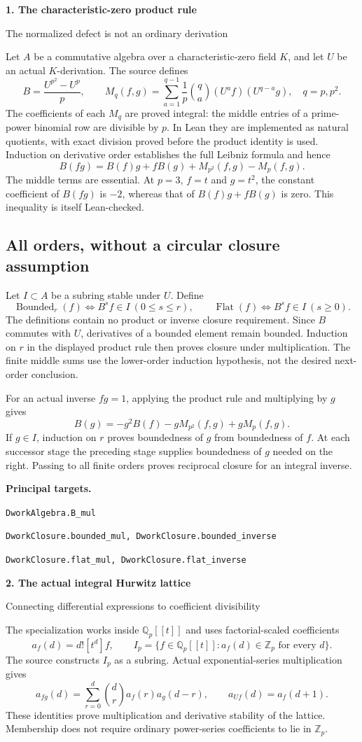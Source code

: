 \documentclass[11pt]{article}
\newcommand{\Z}{\mathbb Z}\newcommand{\N}{\mathbb N}\newcommand{\Q}{\mathbb Q}
\newcommand{\target}[1]{{\footnotesize\texttt{#1}}}
\newcommand{\pageheading}[2]{{\Large\bfseries\color{ink}#1}\par{\small #2}\par\medskip}
\begin{document}
\newpage
\pageheading{1. The characteristic-zero product rule}{The normalized defect is not an ordinary derivation}
Let $A$ be a commutative algebra over a characteristic-zero field $K$, and let $U$ be an actual $K$-derivation. The source defines
\[
 B=\frac{U^{p^2}-U^p}{p},\qquad
 M_q(f,g)=\sum_{a=1}^{q-1}\frac{1}{p}\binom qa
          (U^a f)(U^{q-a}g),\quad q=p,p^2.
\]
The coefficients of each $M_q$ are proved integral: the middle entries of a prime-power binomial row are divisible by $p$. In Lean they are implemented as natural quotients, with exact division proved before the product identity is used. Induction on derivative order establishes the full Leibniz formula and hence
\[
\boxed{B(fg)=B(f)g+fB(g)+M_{p^2}(f,g)-M_p(f,g).}
\]
The middle terms are essential. At $p=3$, $f=t$ and $g=t^2$, the constant coefficient of $B(fg)$ is $-2$, whereas that of $B(f)g+fB(g)$ is zero. This inequality is itself Lean-checked.

\subsection*{All orders, without a circular closure assumption}
Let $I\subset A$ be a subring stable under $U$. Define
\[
 \operatorname{Bounded}_r(f)\iff B^s f\in I\ (0\le s\le r),
 \qquad \operatorname{Flat}(f)\iff B^s f\in I\ (s\ge0).
\]
The definitions contain no product or inverse closure requirement. Since $B$ commutes with $U$, derivatives of a bounded element remain bounded. Induction on $r$ in the displayed product rule then proves closure under multiplication. The finite middle sums use the lower-order induction hypothesis, not the desired next-order conclusion.

For an actual inverse $fg=1$, applying the product rule and multiplying by $g$ gives
\[
 B(g)=-g^2B(f)-gM_{p^2}(f,g)+gM_p(f,g).
\]
If $g\in I$, induction on $r$ proves boundedness of $g$ from boundedness of $f$. At each successor stage the preceding stage supplies boundedness of $g$ needed on the right. Passing to all finite orders proves reciprocal closure for an integral inverse.

\textbf{Principal targets.}\par
\target{DworkAlgebra.B\_mul}\par
\target{DworkClosure.bounded\_mul, DworkClosure.bounded\_inverse}\par
\target{DworkClosure.flat\_mul, DworkClosure.flat\_inverse}

\newpage
\pageheading{2. The actual integral Hurwitz lattice}{Connecting differential expressions to coefficient divisibility}
The specialization works inside $\Q_p[[t]]$ and uses factorial-scaled coefficients
\[
 a_f(d)=d![t^d]f,\qquad
 I_p=\{f\in\Q_p[[t]]:a_f(d)\in\Z_p\text{ for every }d\}.
\]
The source constructs $I_p$ as a subring. Actual exponential-series multiplication gives
\[
 a_{fg}(d)=\sum_{r=0}^{d}\binom dr a_f(r)a_g(d-r),
 \qquad a_{Uf}(d)=a_f(d+1).
\]
These identities prove multiplication and derivative stability of the lattice. Membership does not require ordinary power-series coefficients to lie in $\Z_p$.
\end{document}

